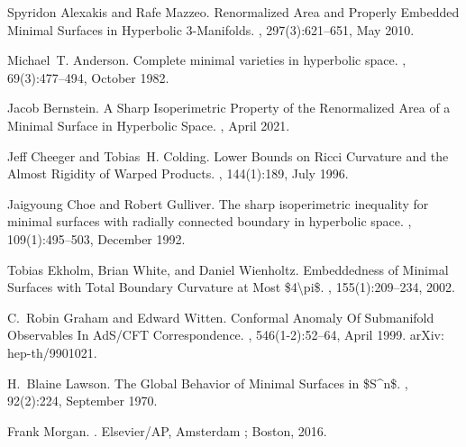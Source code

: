 \documentclass[11pt]{article}
\begin{document}
\begin{thebibliography}{EWW02}

Spyridon Alexakis and Rafe Mazzeo.
\newblock Renormalized {Area} and {Properly} {Embedded} {Minimal} {Surfaces} in
  {Hyperbolic} 3-{Manifolds}.
, 297(3):621--651, May 2010.

Michael~T. Anderson.
\newblock Complete minimal varieties in hyperbolic space.
, 69(3):477--494, October 1982.

Jacob Bernstein.
\newblock A {Sharp} {Isoperimetric} {Property} of the {Renormalized} {Area} of
  a {Minimal} {Surface} in {Hyperbolic} {Space}.
, April 2021.

Jeff Cheeger and Tobias~H. Colding.
\newblock Lower {Bounds} on {Ricci} {Curvature} and the {Almost} {Rigidity} of
  {Warped} {Products}.
, 144(1):189, July 1996.

Jaigyoung Choe and Robert Gulliver.
\newblock The sharp isoperimetric inequality for minimal surfaces with radially
  connected boundary in hyperbolic space.
, 109(1):495--503, December 1992.

Tobias Ekholm, Brian White, and Daniel Wienholtz.
\newblock Embeddedness of {Minimal} {Surfaces} with {Total} {Boundary}
  {Curvature} at {Most} \$4{\textbackslash}pi\$.
, 155(1):209--234, 2002.

C.~Robin Graham and Edward Witten.
\newblock Conformal {Anomaly} {Of} {Submanifold} {Observables} {In} {AdS}/{CFT}
  {Correspondence}.
, 546(1-2):52--64, April 1999.
\newblock arXiv: hep-th/9901021.

H.~Blaine Lawson.
\newblock The {Global} {Behavior} of {Minimal} {Surfaces} in
  \${S}{\textasciicircum}n\$.
, 92(2):224, September 1970.

Frank Morgan.
.
\newblock Elsevier/AP, Amsterdam ; Boston, 2016.

\end{thebibliography}
\end{document}
